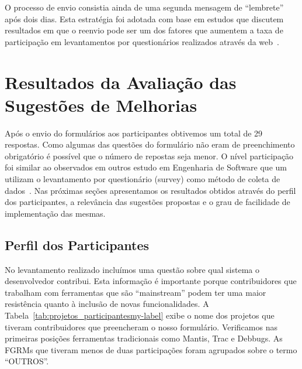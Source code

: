 O processo de envio consistia ainda de uma segunda mensagem de ``lembrete'' após
dois dias. Esta estratégia foi adotada com base em estudos que discutem
resultados em que o reenvio pode ser um dos fatores que aumentem a taxa de
participação em levantamentos por questionários realizados através da
web~\cite{fan2010factors}.

\section{Resultados da Avaliação das Sugestões de Melhorias}
\label{sec:resultados_avaliacao_sug_de_melhorias}

Após o envio do formulários aos participantes obtivemos um total de 29
respostas. Como algumas das questões do formulário não eram de preenchimento
obrigatório é possível que o número de repostas seja menor. O nível participação
foi similar ao observados em outros estudo em Engenharia de Software que um
utilizam o levantamento por questionário (survey) como método de coleta de
dados~\cite{fan2010factors}. Nas próximas seções apresentamos os resultados
obtidos através do perfil dos participantes, a relevância das sugestões
propostas e o grau de facilidade de implementação das mesmas.

\subsection{Perfil dos Participantes}
\label{sub:sug_melhorias_resultados_perfil_dos_participantes}

No levantamento realizado incluímos uma questão sobre qual sistema o
desenvolvedor contribui. Esta informação é importante porque contribuidores que
trabalham com ferramentas que são ``mainstream'' podem ter uma maior resistência
quanto à inclusão de novas funcionalidades. A
Tabela~\ref{tab:projetos_participantesmy-label} exibe o nome dos projetos que
tiveram contribuidores que preencheram o nosso formulário. Verificamos nas
primeiras posições ferramentas tradicionais como Mantis, Trac e Debbugs. As
FGRMs que tiveram menos de duas participações foram agrupados sobre o termo
``OUTROS''.

\begin{table}[htpb]
\centering
{}
\caption{Projetos que os participantes contribuem.}
\label{tab:projetos_participantesmy-label}
\end{table}

